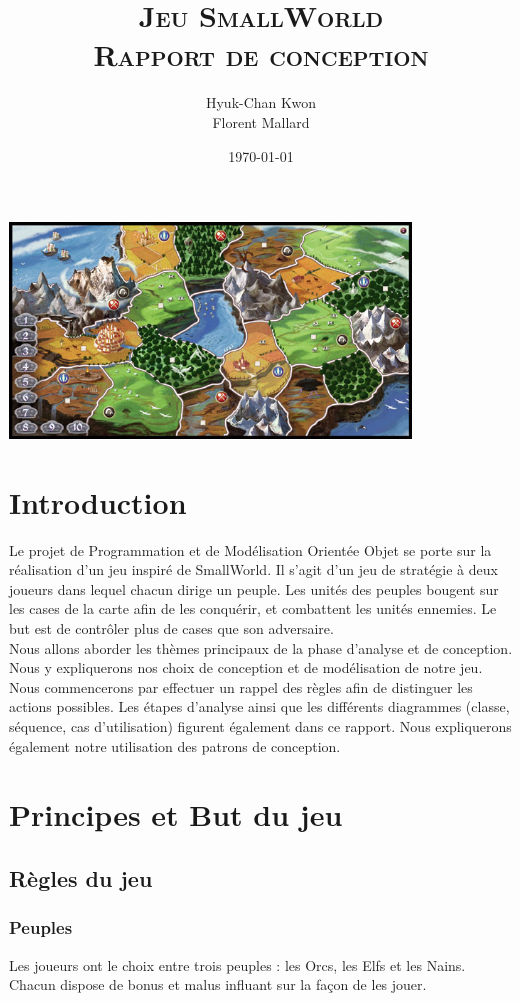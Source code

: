 \documentclass[a4paper]{article}
\title{
\textsc{Jeu SmallWorld\\
\LARGE Rapport de conception}
}
\author
{
	Hyuk-Chan {\sc Kwon}\\
    Florent {\sc Mallard}\\
}
\date{\today}
\begin{document}
\maketitle
\begin{center}
\includegraphics[width=0.8\textwidth]{../Schemas/smallworld.jpg}~\\[5cm]
\end{center}

\newpage
\tableofcontents
\newpage


\section*{Introduction}
Le projet de Programmation et de Modélisation Orientée Objet se porte sur la réalisation d'un jeu inspiré de SmallWorld. Il s'agit d'un jeu de stratégie à deux joueurs dans lequel chacun dirige un peuple. Les unités des peuples bougent sur les cases de la carte afin de les conquérir, et combattent les unités ennemies. Le but est de contrôler plus de cases que son adversaire.\\
Nous allons aborder les thèmes principaux de la phase d'analyse et de conception.
Nous y expliquerons nos choix de conception  et de modélisation de notre jeu. Nous commencerons par effectuer un rappel des règles afin de distinguer les actions possibles.
Les étapes d'analyse ainsi que les différents diagrammes (classe, séquence, cas d'utilisation) figurent également dans ce rapport.
Nous expliquerons également notre utilisation des patrons de conception.

\section{Principes et But du jeu}
	\subsection{Règles du jeu}
		\subsubsection{Peuples}
Les joueurs ont le choix entre trois peuples : les Orcs, les Elfs et les Nains. Chacun dispose de bonus et malus influant sur la façon de les jouer.
\end{document}
